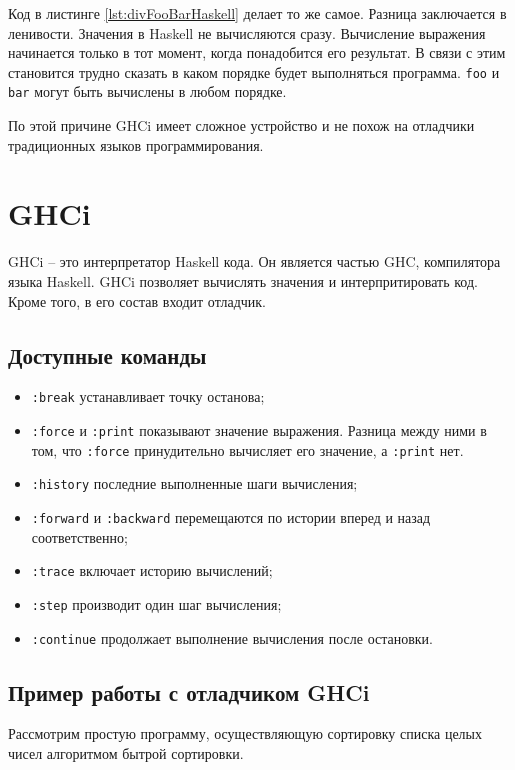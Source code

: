 \documentclass[14pt]{extarticle}
\def\code#1{\texttt{#1}}
\begin{document}
Код в листинге \ref{lst:divFooBarHaskell} делает то же самое. Разница
заключается в ленивости. Значения в Haskell не вычисляются сразу. Вычисление
выражения начинается только в тот момент, когда понадобится его результат. В
связи с этим становится трудно сказать в каком порядке будет выполняться
программа. \code{foo} и \code{bar} могут быть вычислены в любом порядке.

По этой причине GHCi имеет сложное устройство и не похож на отладчики
традиционных языков программирования.

\section{GHCi}

GHCi -- это интерпретатор Haskell кода. Он является частью GHC, компилятора
языка Haskell. GHCi позволяет вычислять значения и интерпритировать код. Кроме
того, в его состав входит отладчик.

\subsection{Доступные команды}

\begin{itemize}
\item \code{:break} устанавливает точку останова;
\item \code{:force} и \code{:print} показывают значение выражения. Разница между ними в
том, что \code{:force} принудительно вычисляет его значение, а \code{:print} нет.
\item \code{:history} последние выполненные шаги вычисления;
\item \code{:forward} и \code{:backward} перемещаются по истории вперед и назад
соответственно;
\item \code{:trace} включает историю вычислений;
\item \code{:step} производит один шаг вычисления;
\item \code{:continue} продолжает выполнение вычисления после остановки.
\end{itemize}

\subsection{Пример работы с отладчиком GHCi}

Рассмотрим простую программу, осуществляющую сортировку списка целых чисел
алгоритмом бытрой сортировки.
\end{document}
